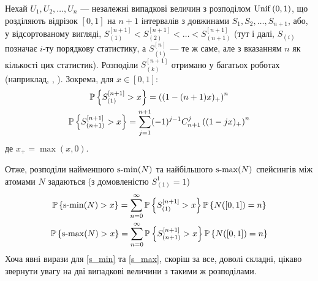 Нехай $U_1, U_2, \dots, U_{n}$ ---
незалежні випадкові величин
з розподілом $\mathrm{Unif}\left(0, 1\right)$, що розділяють відрізок $[0, 1]$ на $n+1$
інтервалів з довжинами $S_1, S_2, \dots, S_{n+1}$, або, у відсортованому вигляді, 
$S_{(1)}^{[n+1]} < S_{(2)}^{[n+1]} < \dots < S_{(n+1)}^{[n+1]}$
(тут і далі, $S_{(i)}$ позначає $i$-ту порядкову статистику, а
$S_{(i)}^{[n]}$ --- те ж саме, але з вказанням $n$ як кількості цих статистик).
Розподіли $S_{(k)}^{[n+1]}$ отримано у багатьох роботах
(наприклад, \cite{Holst_1980}, \cite{Pinelis_2019}). Зокрема, для $x\in[0,1]$:
\begin{gather}
    \label{min_spacing}
    \P{S_{(1)}^{[n+1]} > x} = \left((1-(n+1)x)_+\right)^n \\
    \label{max_spacing}
    \P{S_{(n+1)}^{[n+1]} > x} = 
    \sum_{j=1}^{n+1} (-1)^{j-1} C_{n+1}^j \left((1-jx)_+\right)^n
\end{gather}
де $x_+ = \max(x, 0)$.

Отже, розподіли найменшого $\operatorname{s-min}(N)$ та найбільшого $\operatorname{s-max}(N)$ спейсингів 
між атомами $N$ задаються
(з домовленістю $S_{(1)}^{1} = 1$)
\begin{gather}
    \label{s_min}
    \P{\smin(N) > x} = 
    \sum_{n=0}^{\infty} \P{S_{(1)}^{[n+1]} > x} \P{N([0, 1]) = n} \\
    \label{s_max}
    \P{\smax(N) > x} = 
    \sum_{n=0}^{\infty} \P{S_{(n+1)}^{[n+1]} > x} \P{N([0, 1]) = n}
\end{gather}
Хоча явні вирази для \eqref{s_min} та \eqref{s_max},
скоріш за все, доволі складні, цікаво звернути увагу на дві випадкові величини
з такими ж розподілами.

